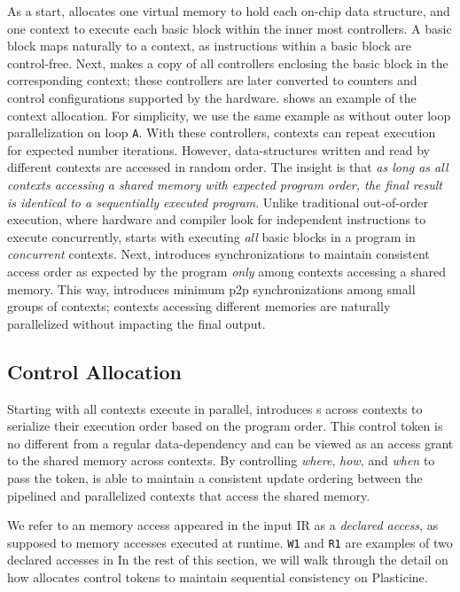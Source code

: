 As a start, \name allocates one virtual memory to hold each on-chip data structure, and 
one context to execute each basic block within the inner most controllers. 
A basic block maps naturally to a context, as instructions within a basic block are control-free. 
Next, \name makes a copy of all controllers enclosing the basic block in the corresponding context;
these controllers are later converted to counters and control configurations supported by the
hardware. 
 shows an example of the context allocation. For simplicity, we use the same
example as  without outer loop parallelization on loop \texttt{A}.
With these controllers, contexts can repeat execution for expected number iterations. However,
data-structures written and read by different contexts are accessed in random order.
The insight is that \emph{as long as all contexts accessing a shared memory with expected program order,
the final result is identical to a sequentially executed program}.
Unlike traditional out-of-order execution, where hardware and compiler look for independent instructions to
execute concurrently, \name starts with executing \emph{all} basic blocks in a program in \emph{concurrent} contexts.
Next, \name introduces synchronizations to maintain consistent access order as expected by the 
program \emph{only} among contexts accessing a shared memory. 
This way, \name introduces minimum p2p synchronizations among small groups of contexts; contexts
accessing different memories are naturally parallelized without impacting the final output.

\subsection{Control Allocation} 
\label{sec:sync}
Starting with all contexts execute in parallel, \name introduces s across contexts
to serialize their execution order based on the program order.
This control token is no different from a regular data-dependency and can be viewed as 
an access grant to the shared memory across contexts. 
By controlling {\em where}, {\em how}, and {\em when} to pass the token, \name 
is able to maintain a consistent update ordering between the pipelined and parallelized contexts that 
access the shared memory.

We refer to an memory access appeared in the input IR as a \emph{declared access}, as supposed to
memory accesses executed at runtime.
\texttt{W1} and \texttt{R1} are examples of two declared accesses in 
In the rest of this section, we will walk through the detail on how \name allocates control tokens
to maintain sequential consistency on Plasticine.

